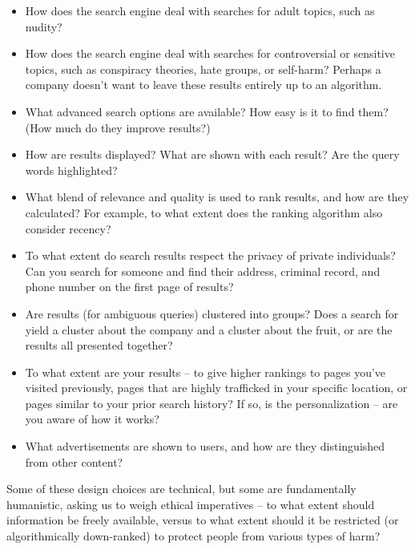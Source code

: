 \begin{itemize}
\item How does the search engine deal with searches for adult topics, such as nudity?

\item How does the search engine deal with searches for controversial or sensitive topics, such as conspiracy theories, hate groups, or self-harm?  Perhaps a company doesn't want to  leave these results entirely up to an algorithm.

\item What advanced search options are available?  How easy is it to find them?  (How much do they improve results?)

\item How are results displayed?  What  are shown with each result?  Are the query words highlighted?

\item What blend of relevance and quality is used to rank results, and how are they calculated?  For example, to what extent does the ranking algorithm also consider recency? 

\item To what extent do search results respect the privacy of private individuals?  Can you search for someone and find their address, criminal record, and phone number on the first page of results?  

\item Are results (for ambiguous queries) clustered into groups?  Does a search for  yield a cluster about the company and a cluster about the fruit, or are the results all presented together?

\item To what extent are your results  -- to give higher rankings to pages you've visited previously, pages that are highly trafficked in your specific location, or pages similar to your prior search history?  If so, is the personalization  -- are you aware of how it works?

\item What advertisements are shown to users, and how are they distinguished from other content?

\end{itemize}

Some of these design choices are technical, but some are fundamentally humanistic, asking us to weigh ethical imperatives -- to what extent should information be freely available, versus to what extent should it be restricted (or algorithmically down-ranked) to protect people from various types of harm?


